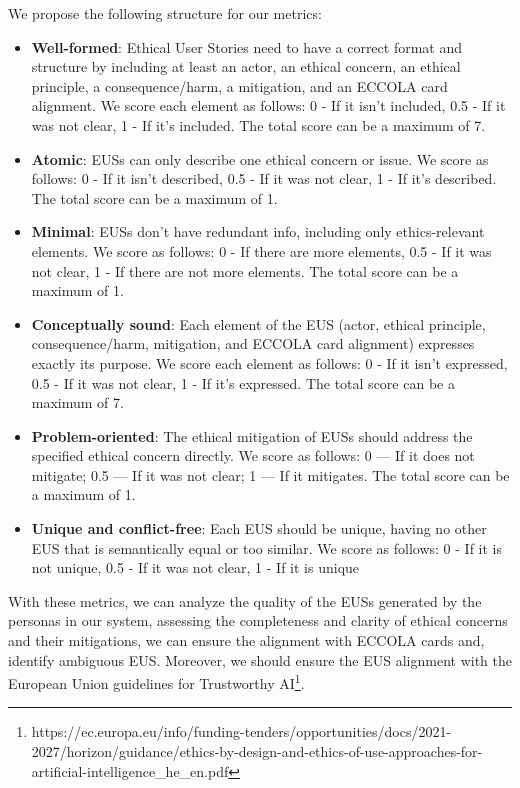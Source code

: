 We propose %
the following structure for our metrics:
\begin{itemize}
    \item \textbf{Well-formed}: Ethical User Stories need to have a correct format and structure by including at least an actor, an ethical concern, an ethical principle, a consequence/harm, a mitigation, and an ECCOLA card alignment. We score each element as follows:
    0 - If it isn't included, 0.5 - If it was not clear, 1 - If it's included. The total score can be a maximum of 7.
    
    \item \textbf{Atomic}: EUSs can only describe one ethical concern or issue. We score as follows:
    0 - If it isn't described, 0.5 - If it was not clear, 1 - If it's described. The total score can be a maximum of 1.

    \item \textbf{Minimal}: EUSs don't have redundant info, including only ethics-relevant elements. We score as follows:
    0 - If there are more elements, 0.5 - If it was not clear, 1 - If there are not more elements. The total score can be a maximum of 1.

    \item \textbf{Conceptually sound}: Each element of the EUS (actor, ethical principle, consequence/harm, mitigation, and ECCOLA card alignment) expresses exactly its purpose. We score each element as follows:
    0 - If it isn't expressed, 0.5 - If it was not clear, 1 - If it's expressed. The total score can be a maximum of 7.

    \item  \textbf{Problem-oriented}: The ethical mitigation of EUSs should address the specified ethical concern directly. We score as follows:
     0 — If it does not mitigate; 0.5 — If it was not clear; 1 — If it mitigates. The total score can be a maximum of 1.

     \item \textbf{Unique and conflict-free}: Each EUS should be unique, having no other EUS that is semantically equal or too similar. We score as follows:
     0 - If it is not unique, 0.5 - If it was not clear, 1 - If it is unique
\end{itemize}

With these metrics, we can analyze the quality of the EUSs generated by the personas in our system, assessing the completeness and clarity of ethical concerns and their mitigations, we can ensure the alignment with ECCOLA cards and, identify ambiguous EUS. Moreover, we should ensure the EUS alignment with the European Union guidelines for Trustworthy AI\footnote{https://ec.europa.eu/info/funding-tenders/opportunities/docs/2021-2027/horizon/guidance/ethics-by-design-and-ethics-of-use-approaches-for-artificial-intelligence\_he\_en.pdf}.

